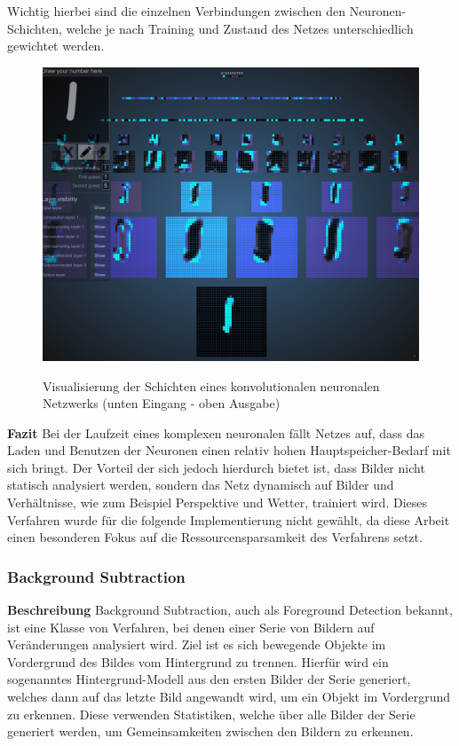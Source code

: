Wichtig hierbei sind die einzelnen Verbindungen zwischen den Neuronen-Schichten, welche je nach Training und Zustand des Netzes unterschiedlich gewichtet werden.
\begin{figure}[ht]
   \centering
     \includegraphics[width=15cm]{Bilder/cnn-visualized} \\
 \caption{Visualisierung der Schichten eines konvolutionalen neuronalen Netzwerks (unten Eingang - oben Ausgabe)}
 \label{fig:CNN}
\end{figure}
\newline\newline
\textbf{Fazit}\newline
Bei der Laufzeit eines komplexen neuronalen fällt Netzes auf, dass das Laden und Benutzen der Neuronen einen relativ hohen Hauptspeicher-Bedarf mit sich bringt.
Der Vorteil der sich jedoch hierdurch bietet ist, dass Bilder nicht statisch analysiert werden, sondern das Netz dynamisch auf Bilder und Verhältnisse, wie zum Beispiel Perspektive und Wetter, trainiert wird.
Dieses Verfahren wurde für die folgende Implementierung nicht gewählt, da diese Arbeit einen besonderen Fokus auf die Ressourcensparsamkeit des Verfahrens setzt.
\newpage

\subsubsection{Background Subtraction}
\textbf{Beschreibung}\newline
Background Subtraction, auch als Foreground Detection bekannt, ist eine Klasse von Verfahren, bei denen einer Serie von Bildern auf Veränderungen analysiert wird.
Ziel ist es sich bewegende Objekte im Vordergrund des Bildes vom Hintergrund zu trennen.
Hierfür wird ein sogenanntes Hintergrund-Modell aus den ersten Bilder der Serie generiert, welches dann auf das letzte Bild angewandt wird, um ein Objekt im Vordergrund zu erkennen. 
Diese verwenden Statistiken, welche über alle Bilder der Serie generiert werden, um Gemeinsamkeiten zwischen den Bildern zu erkennen.

